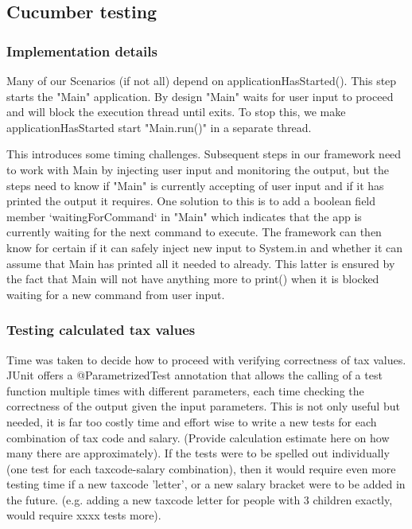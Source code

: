 \subsection{Cucumber testing}




\subsubsection{Implementation details}


Many of our Scenarios (if not all) depend on applicationHasStarted(). This step starts the "Main" application. By design "Main" waits for user input to proceed and will block the execution thread until exits. To stop this, we make applicationHasStarted start "Main.run()" in a separate thread. 

This introduces some timing challenges. Subsequent steps in our framework need to work with Main by injecting user input and monitoring the output, but the steps need to know if "Main" is currently accepting of user input and if it has printed the output it requires. 
One solution to this is to add a boolean field member `waitingForCommand` in "Main" which indicates that the app is currently waiting for the next command to execute. The framework can then know for certain if it can safely inject new input to System.in and whether it can assume that Main has printed all it needed to already. This latter is ensured by the fact that Main will not have anything more to print() when it is blocked waiting for a new command from user input. 

\subsubsection{Testing calculated tax values}

Time was taken to decide how to proceed with verifying correctness of tax values. JUnit offers a \linebreak @ParametrizedTest annotation that allows the calling of a test function multiple times with different parameters, each time checking the correctness of the output given the input parameters. This is not only useful but needed, it is far too costly time and effort wise to write a new tests for each combination of tax code and salary. (Provide calculation estimate here on how many there are approximately).
If the tests were to be spelled out individually (one test for each taxcode-salary combination), then it would require even more testing time if a new taxcode 'letter', or a new salary bracket were to be added in the future. (e.g. adding a new taxcode letter for people with 3 children exactly, would require xxxx tests more). 

